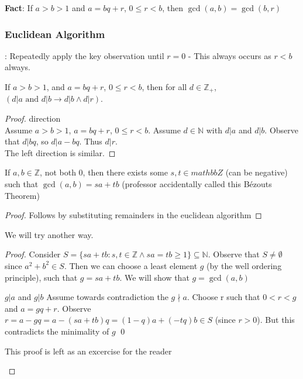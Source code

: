 \documentclass[11pt]{scrartcl}
\begin{document}
\textbf{Fact}: If $a > b > 1$ and $a = bq + r$,  $0 \leq r < b$, then $\gcd(a, b) = \gcd(b, r)$


\subsubsection{Euclidean Algorithm}
: Repeatedly apply the key observation until $r=0$ - This always occurs as $r<b$ always.

\begin{lemma}
    If $a>b>1$, and $a = bq + r$, $0 \leq r < b$, then for all $d \in \mathbb{Z}_+$, $(d|a \text{ and } d|b \rightarrow d|b \wedge d|r)$. 
\end{lemma}
\begin{proof}
    \rightarrow direction\\
    Assume $a>b>1$, $a = bq + r$, $0\leq r < b$.  Assume $d \in \mathbb{N}$ with $d|a$ and $d|b$.  Observe that $d|bq$, so $d|a-bq$.  Thus $d|r$.  \\
    The left direction is similar.
\end{proof}
\begin{theorem}
If $a, b\in \mathbb{Z}$, not both $0$, then there exists some $s, t \in mathbb{Z}$ (can be negative) such that $\gcd(a,b) = sa + tb$     (professor accidentally called this Bézouts Theorem)
\end{theorem}
\begin{proof}
    Follows by substituting remainders in the euclidean algorithm
\end{proof}
We will try another way.
\begin{proof}
    Consider $S = \{sa + tb: s, t \in \mathbb{Z} \wedge sa = tb \geq 1\} \subseteq \mathbb{N}$.  Observe that $S \neq \emptyset$ since $a^2 + b^2 \in S$.  Then we can choose a least element $g$ (by the well ordering principle), such that $g = sa + tb$.  We will show that $g = \gcd(a, b)$ 
    \begin{proposition} $g|a$ and $g|b$
        Assume towards contradiction the $g \nmid a$. Choose r such that $0<r<g$ and $a = gq + r$.  Observe $r = a - gq = a - (sa + tb) q = (1-q) a + (-tq) b \in S$ (since $r>0$).  But this contradicts the minimality of $g$  \qed
    \end{proposition}
    \begin{proposition}
        This proof is left as an excercise for the reader
    \end{proposition}
\end{proof}
\end{document}
